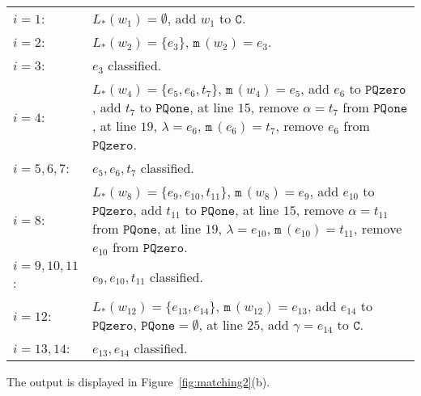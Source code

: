 \documentclass[12pt]{article}
\newcommand{\ma}{\texttt{m}\,} \newcommand{\re}{\texttt{r}\,}
\newcommand{\sC}{\texttt{C}} \newcommand{\sD}{\texttt{D}} \newcommand{\sM}{\texttt{M}} \newcommand{\sL}{\texttt{L}}
\begin{document}
\begin{center}
\begin{tabular}[b]{ll}
$i=1$: &   $L_*(w_1)=\emptyset$, add $w_1$ to $\sC$.\\
$i=2$: & $L_*(w_2)=\{e_3\}$, $\ma(w_2)=e_3$.\\
$i=3$: &  $e_3$ classified.\\
$i=4$: & \parbox[t]{10cm}{$L_*(w_4)=\{e_5,e_6,t_7\}$, $\ma(w_4)=e_5$,\\
 add $e_6$ to $\texttt{PQzero}$, add $t_7$ to $\texttt{PQone}$,\\
at line $15$, remove $\alpha=t_7$ from $\texttt{PQone}$,\\
 at line $19$, $\lambda=e_6$, $\ma(e_6)=t_7$, remove $e_6$ from $\texttt{PQzero}$.}\\
$i=5,6,7$: & $e_5, e_6, t_7$ classified.\\
 $i=8$: &  \parbox[t]{10cm}{ $L_*(w_8)=\{e_9,e_{10},t_{11}\}$, $\ma(w_8)=e_9$, \\
		add $e_{10}$ to $\texttt{PQzero}$, add $t_{11}$ to $\texttt{PQone}$,\\
    at line $15$, remove $\alpha=t_{11}$ from $\texttt{PQone}$, \\
    at line $19$, $\lambda=e_{10}$, $\ma(e_{10})=t_{11}$, remove $e_{10}$ from $\texttt{PQzero}$.}\\
$i=9,10,11$: & $e_9, e_{10}, t_{11}$ classified.\\
$i=12$: & \parbox[t]{10cm}{ $L_*(w_{12})=\{e_{13},e_{14}\}$, $\ma(w_{12})=e_{13}$, \\
		add $e_{14}$ to $\texttt{PQzero}$, $\texttt{PQone}=\emptyset$,\\
    at line $25$, add $\gamma=e_{14}$ to $\sC$.}\\
$i=13,14$: &  $e_{13}, e_{14}$ classified.
\end{tabular}
\end{center}

The output is displayed in Figure~\ref{fig:matching2}(b).
\end{document}

